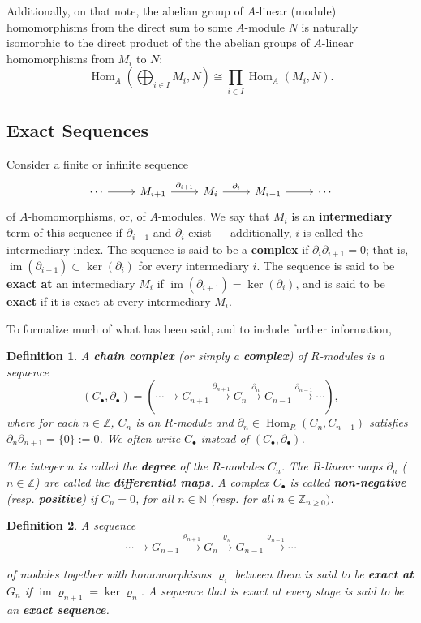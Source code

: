 \documentclass[12pt,reqno]{amsart}
\theoremstyle{plain}
\newtheorem{defi}{Definition}
\DeclareMathOperator{\im}{im}
\newcommand{\nn}{\mathbb N}
\newcommand{\zz}{\mathbb Z}
\DeclareMathOperator{\Hom}{Hom}
\begin{document}
Additionally, on that note, the abelian group of $A$-linear (module) homomorphisms from the direct sum to some $A$-module $N$ is naturally isomorphic to the direct product of the the abelian groups of $A$-linear homomorphisms from $M_i$ to $N$:
$$ \Hom_A \left( \bigoplus_{i \in I} M_i , N \right) \cong \prod_{i \in I} \Hom_A (M_i, N).$$
\subsection{Exact Sequences}

Consider a finite or infinite sequence
$$\begin{tikzcd}
\cdots \arrow[r] & M_{i+1} \arrow[r, "\partial_{i+1}"] & M_i \arrow[r, "\partial_i"] & M_{i-1} \arrow[r] & \cdots
\end{tikzcd}$$ of $A$-homomorphisms, or, of $A$-modules. We say that $M_i$ is an \textbf{intermediary} term of this sequence if $\partial_{i+1}$ and $\partial_i$ exist — additionally, $i$ is called the intermediary index. The sequence is said to be a \textbf{complex} if $\partial_i \partial_{i+1} = 0$; that is, $ \im (\partial_{i+1}) \subset \ker (\partial_i)$ for every intermediary $i$. The sequence is said to be \textbf{exact at} an intermediary $M_i$ if $\im (\partial_{i+1}) = \ker (\partial_i)$, and is said to be \textbf{exact} if it is exact at every intermediary $M_i$. 

To formalize much of what has been said, and to include further information,
\begin{defi}A \textbf{chain complex} (or simply a \textbf{complex}) of $R$-modules is a sequence 
$$ (C_{\bullet}, \partial_{\bullet }) = \left( \cdots \rightarrow C_{n+1} \xrightarrow{\partial_{n+1}} C_n \xrightarrow{\partial_n} C_{n-1} \xrightarrow{\partial_{n-1}} \cdots \right), $$
where for each $n \in \zz$, $C_n$ is an $R$-module and $\partial_ n \in \Hom_R (C_n, C_{n-1})$ satisfies $\partial_n \partial_{n+1} = \{ 0 \}:=0$. We often write $C_{\bullet}$ instead of $(C_{\bullet}, \partial_{\bullet })$. 

The integer $n$ is called the \textbf{degree} of the $R$-modules $C_n$. The $R$-linear maps $\partial_n$ ($n \in \zz$) are called the \textbf{differential maps}. A complex $C_{\bullet}$ is called \textbf{non-negative} (resp. \textbf{positive}) if $C_n = 0$, for all $n \in \nn$ (resp. for all $n \in \zz_{n \geq 0})$. 
\end{defi}

\begin{defi} A sequence 
$$ \cdots \rightarrow G_{n+1} \xrightarrow{\varrho_{n+1}} G_n \xrightarrow{\varrho_n} G_{n-1} \xrightarrow{\varrho_{n-1}} \cdots $$

of modules together with homomorphisms $\varrho_i$ between them is said to be \textbf{exact at $G_n$} if $\im \varrho_{n+1} = \ker \varrho_n$. A sequence that is exact at every stage is said to be an \textbf{exact sequence}.
\end{defi} 
\end{document}
